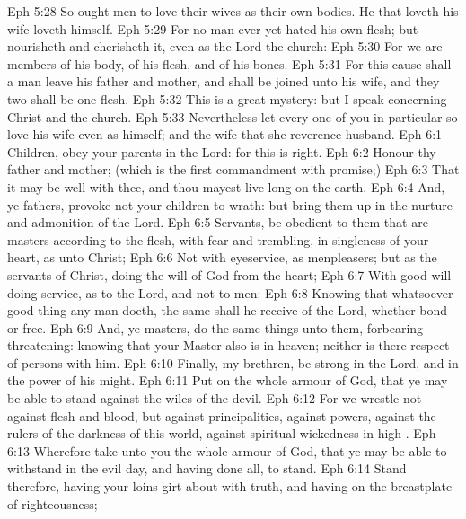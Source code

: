 \vs Eph 5:28 So ought men to love their wives as their own bodies. He that loveth his wife loveth himself.
\vs Eph 5:29 For no man ever yet hated his own flesh; but nourisheth and cherisheth it, even as the Lord the church:
\vs Eph 5:30 For we are members of his body, of his flesh, and of his bones.
\vs Eph 5:31 For this cause shall a man leave his father and mother, and shall be joined unto his wife, and they two shall be one flesh.
\vs Eph 5:32 This is a great mystery: but I speak concerning Christ and the church.
\vs Eph 5:33 Nevertheless let every one of you in particular so love his wife even as himself; and the wife  that she reverence  husband.
\vs Eph 6:1 Children, obey your parents in the Lord: for this is right.
\vs Eph 6:2 Ho\-nour thy father and mother; (which is the first commandment with promise;)
\vs Eph 6:3 That it may be well with thee, and thou mayest live long on the earth.
\vs Eph 6:4 And, ye fathers, provoke not your children to wrath: but bring them up in the nurture and admonition of the Lord.
\vs Eph 6:5 Servants, be obedient to them that are  masters according to the flesh, with fear and trembling, in singleness of your heart, as unto Christ;
\vs Eph 6:6 Not with eyeservice, as menpleasers; but as the servants of Christ, doing the will of God from the heart;
\vs Eph 6:7 With good will doing service, as to the Lord, and not to men:
\vs Eph 6:8 Knowing that whatsoever good thing any man doeth, the same shall he receive of the Lord, whether  bond or free.
\vs Eph 6:9 And, ye masters, do the same things unto them, forbearing threatening: knowing that your Master also is in heaven; neither is there respect of persons with him.
\vs Eph 6:10 Finally, my brethren, be strong in the Lord, and in the power of his might.
\vs Eph 6:11 Put on the whole armour of God, that ye may be able to stand against the wiles of the devil.
\vs Eph 6:12 For we wrestle not against flesh and blood, but against principalities, against powers, against the rulers of the darkness of this world, against spiritual wickedness in high .
\vs Eph 6:13 Wherefore take unto you the whole armour of God, that ye may be able to withstand in the evil day, and having done all, to stand.
\vs Eph 6:14 Stand therefore, having your loins girt about with truth, and having on the breastplate of righteousness;
